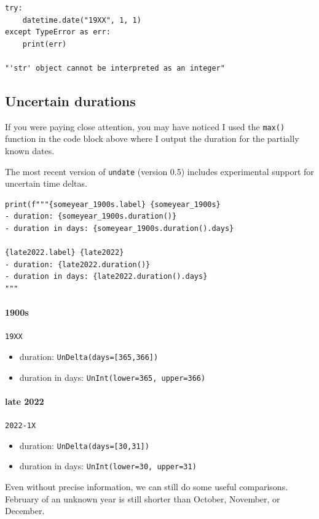 \documentclass{anthology-ch}         %
\begin{document}
\begin{verbatim}
try:
    datetime.date("19XX", 1, 1)
except TypeError as err:
    print(err)

"'str' object cannot be interpreted as an integer"
\end{verbatim}

\subsection{Uncertain durations}

If you were paying close attention, you may have noticed I used the
\texttt{max()} function in the code block above where I output the duration for the partially known dates.

The most recent version of \texttt{undate} (version 0.5) includes experimental support for 
uncertain time deltas.

\begin{verbatim}
print(f"""{someyear_1900s.label} {someyear_1900s}
- duration: {someyear_1900s.duration()}
- duration in days: {someyear_1900s.duration().days}

{late2022.label} {late2022}
- duration: {late2022.duration()}
- duration in days: {late2022.duration().days}
"""
\end{verbatim}

\paragraph{1900s} \texttt{19XX}
\begin{itemize}
    \item duration: \texttt{UnDelta(days=[365,366])}
    \item duration in days: \texttt{UnInt(lower=365, upper=366)}
\end{itemize}

\paragraph{late 2022} \texttt{2022-1X}
\begin{itemize}
    \item duration: \texttt{UnDelta(days=[30,31])}
    \item duration in days: \texttt{UnInt(lower=30, upper=31)}
\end{itemize}
    
    
Even without precise information, we can still do some useful comparisons. February of an unknown year is still shorter than October, November, or December.
\end{document}
